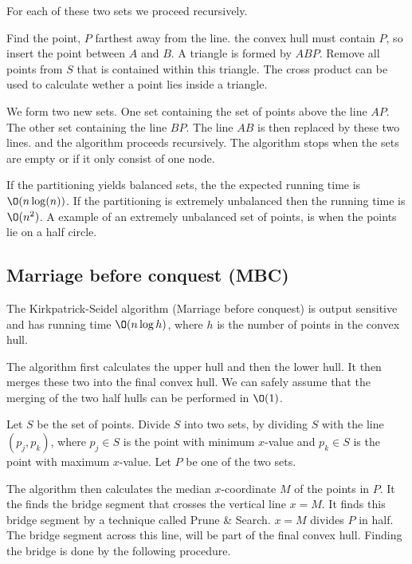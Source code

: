 \documentclass[10pt]{article}
\begin{document}
For each of these two sets we proceed recursively.

Find the point, $P$ farthest away from the line. the convex hull must contain $P$, so insert the point between $A$ and $B$. A triangle is formed by $ABP$. Remove all points from $S$ that is contained within this triangle. The cross product can be used to calculate wether a point lies inside a triangle.                                                                                        

We form two new sets. One set containing the set of points above the line $AP$. The other set containing the line $BP$. The line $AB$ is then replaced by these two lines. and the algorithm proceeds recursively. The algorithm stops when the sets are empty or if it only consist of one node.

If the partitioning yields balanced sets, the the expected running time is $\O(n\log(n))$. If the partitioning is extremely unbalanced then the running time is $\O(n^2)$. A example of an extremely unbalanced set of points, is when the points lie on a half circle.



\subsection{Marriage before conquest (MBC)} %
\label{sub:marriage_before_conquest_mbc_}
The Kirkpatrick-Seidel algorithm (Marriage before conquest) is output sensitive and has running time $\O(n\log{h})$, where $h$ is the number of points in the convex hull.

The algorithm first calculates the upper hull and then the lower hull. It then merges these two into the final convex hull. We can safely assume that the merging of the two half hulls can be performed in $\O(1)$.

Let $S$ be the set of points. Divide $S$ into two sets, by dividing $S$ with the line $(p_j,p_k)$, where $p_j \in S$ is the point with minimum $x$-value and $p_k \in S$ is the point with maximum $x$-value. Let $P$ be one of the two sets.

The algorithm then calculates the median $x$-coordinate $M$ of the points in $P$. It the finds the bridge segment that crosses the vertical line $x=M$. It finds this bridge segment by a technique called Prune \& Search. $x=M$ divides $P$ in half. The bridge segment across this line, will be part of the final convex hull. Finding the bridge is done by the following procedure.
\end{document}
